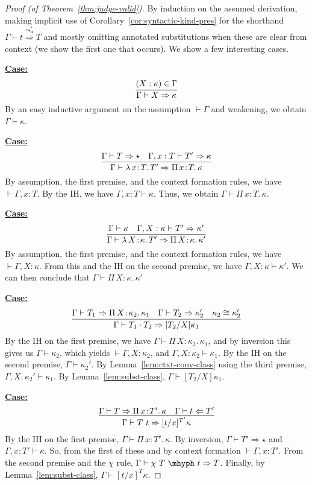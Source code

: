 \documentclass{article}
\newcommand{\abs}[4]{{#1}\, #2\! : \! #3.\, #4}
\newcommand{\leadstocs}[0]{\ensuremath{\leadsto_{\mathbf{n}}^*}}
\newcommand{\tpcheck}[0]{\Leftarrow}
\newcommand{\tpsynth}[0]{\Rightarrow}
\newcommand{\tpsynthleads}[0]{\ensuremath{\overset{\leadstocs}{\Rightarrow}}}
\newcommand{\startcase}[1]{\vspace{#1} \noindent\textbf{\underline{Case:}}}
\begin{document}
\begin{proof}[Proof (of Theorem~\ref{thm:judge-valid})]
  By induction on the assumed derivation, making implicit use of
  Corollary~\ref{cor:syntactic-kind-pres} for the shorthand \(\Gamma \vdash t
  \tpsynthleads T\) and mostly omitting annotated substitutions when these are
  clear from context (we show the first one that occurs).
  We show a few interesting cases.

  \startcase{.2cm}
  \[
    \infer{\Gamma \vdash X \tpsynth \kappa}{(X : \kappa) \in \Gamma}
  \]
  By an easy inductive argument on the assumption \(\vdash \Gamma\) and
  weakening, we obtain \(\Gamma \vdash \kappa\).

  \startcase{.2cm}
  \[
    \infer{\Gamma\vdash\abs{\lambda}{x}{T}{T'} \tpsynth \abs{\Pi}{x}{T}{\kappa}}{\Gamma \vdash T \tpsynth \star & \Gamma,x:T\vdash T'\tpsynth\kappa}
  \]
  By assumption, the first premise, and the context formation rules, we have
  \(\vdash \Gamma,x:T\).
  By the IH, we have \(\Gamma,x:T \vdash \kappa\).
  Thus, we obtain \(\Gamma \vdash \abs{\Pi}{x}{T}{\kappa}\).

  \startcase{.2cm}
  \[
    \infer{\Gamma\vdash\abs{\lambda}{X}{\kappa}{T'} \tpsynth \abs{\Pi}{X}{\kappa}{\kappa'}}{\Gamma \vdash \kappa & \Gamma,X:\kappa\vdash T'\tpsynth\kappa'}
  \]
  By assumption, the first premise, and the context formation rules, we have
  \(\vdash \Gamma,X:\kappa\).
  From this and the IH on the second premise, we have \(\Gamma,X:\kappa \vdash
  \kappa'\).
  We can then conclude that \(\Gamma \vdash \abs{\Pi}{X}{\kappa}{\kappa'}\)

  
  \startcase{.2cm}
  \[
    \infer{\Gamma\vdash T_1 \cdot T_2 \tpsynth [T_2/X]\kappa_1}{\Gamma\vdash T_1 \tpsynth \abs{\Pi}{X}{\kappa_2}{\kappa_1} & \Gamma\vdash T_2 \tpsynth \kappa_2' & \kappa_2 \cong \kappa_2'}
  \]
  By the IH on the first premise, we have \(\Gamma \vdash
  \abs{\Pi}{X}{\kappa_2}{\kappa_1}\), and by inversion this gives us \(\Gamma
  \vdash \kappa_2\), which yields \(\vdash \Gamma,X:\kappa_2\), and
  \(\Gamma,X:\kappa_2 \vdash \kappa_1\).
  By the IH on the second premise, \(\Gamma \vdash \kappa_2'\).
  By Lemma~\ref{lem:ctxt-conv-class} using the third premise,
  \(\Gamma,X:\kappa_2' \vdash \kappa_1\).
  By Lemma~\ref{lem:subst-class}, \(\Gamma \vdash [T_2/X]\kappa_1\).

  \startcase{.2cm}
  \[
    \infer{\Gamma\vdash T\ t \tpsynth [t/x]^{T'}\kappa}{\Gamma\vdash T \tpsynth \abs{\Pi}{x}{T'}{\kappa} & \Gamma\vdash t \tpcheck T'}
  \]
  By the IH on the first premise, \(\Gamma \vdash \abs{\Pi}{x}{T'}{\kappa}\).
  By inversion, \(\Gamma \vdash T' \tpsynth \star\) and \(\Gamma,x:T' \vdash
  \kappa\).
  So, from the first of these and by context formation \(\vdash \Gamma,x:T'\).
  From the second premise and the \(\chi\) rule, \(\Gamma \vdash \chi\ T\
  \mhyph\ t \tpsynth T\).
  Finally, by Lemma~\ref{lem:subst-class}, \(\Gamma \vdash [t/x]^{T} \kappa\).


\end{proof}
\end{document}
